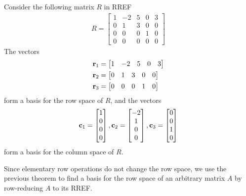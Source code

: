 \documentclass[12pt,letterpaper,reqno]{article}
\numberwithin{equation}{section}
\newcommand{\fixme}[1]{{\color{orange}{[#1]}}}
\begin{document}
\begin{pf}
\fixme{Add proof.}	
\end{pf}


\begin{example}
Consider the following matrix $R$ in RREF
\begin{align*}
	R=\begin{bmatrix}
		1&-2&5&0&3\\0&1&3&0&0\\
		0&0&0&1&0\\0&0&0&0&0
	\end{bmatrix}
\end{align*}	
The vectors 
\begin{align*}
	{\bf r}_1&=\begin{bmatrix}
		1&-2&5&0&3
	\end{bmatrix} \\
	{\bf r}_2&=\begin{bmatrix}
		0&1&3&0&0
	\end{bmatrix} \\
	{\bf r}_3&=\begin{bmatrix}
		0&0&0&1&0
	\end{bmatrix} \\	
\end{align*}
form a basis for the row space of $R$, and the vectors 
\begin{align*}
	{\bf c}_1=\begin{bmatrix}
		1\\0\\0\\0
	\end{bmatrix}, {\bf c}_2=\begin{bmatrix}
		-2\\1\\0\\0
	\end{bmatrix}, {\bf c}_3=\begin{bmatrix}
		0\\0\\1\\0
	\end{bmatrix}
\end{align*}
form a basis for the column space of $R$.
\end{example}

Since elementary row operations do not change the row space, we use the previous theorem to find a basis for the row space of an arbitrary matrix $A$ by row-reducing $A$ to its RREF.
	
\end{document}
